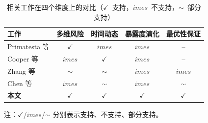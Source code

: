 
\begin{table}[t]
  \centering
  \caption{相关工作在四个维度上的对比（$\checkmark$~支持，$	imes$~不支持，$\sim$~部分支持）}
  \label{tab:literature-comparison}
  \footnotesize
  \begin{threeparttable}
  \begin{tabular}{@{}lcccc@{}}
    \toprule
    工作 & 多维风险 & 时间动态 & 暴露度演化 & 最优性保证 \\
    \midrule
    Primatesta 等 \cite{primatesta2022review} & $\checkmark$        & $	imes$           & $	imes$           & --          \\
    Cooper 等 \cite{cooper2023proportional}   & $	imes$            & $\checkmark$       & $	imes$           & --          \\
    Zhang 等 \cite{zhang2024spatiotemporal}   & $\sim$              & $\sim$             & $	imes$           & $	imes$    \\
    Chen 等 \cite{chen2024costastar}          & $	imes$            & $\sim$             & $	imes$           & $\sim$      \\
    \midrule
    \textbf{本文} & $\checkmark$ & $\checkmark$ & $\checkmark$ & $\checkmark$ \\
    \bottomrule
  \end{tabular}
  \begin{tablenotes}
    \footnotesize
    \item[] 注：$\checkmark$/$	imes$/$\sim$ 分别表示支持、不支持、部分支持。
  \end{tablenotes}
  \end{threeparttable}
\end{table}
